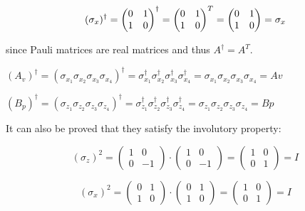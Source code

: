 \documentclass{Configuration_Files/PoliMi3i_thesis}
\begin{document}
\[
\text{$( \sigma_x )^{\dagger}$} = 
\begin{pmatrix}
	0 & 1 \\
	1 & 0
\end{pmatrix} ^\dagger =
\begin{pmatrix}
	0 & 1 \\
	1 & 0
\end{pmatrix}^T =
\begin{pmatrix}
	0 & 1 \\
	1 & 0
\end{pmatrix}
= \text{$ \sigma_x $}
\]\newline

since Pauli matrices are real matrices and thus $A^{\dagger}=A^T$.

\begin{center}
	$(A_v)^{\dagger} = (\sigma_{x_1} \sigma_{x_2} \sigma_{x_3} \sigma_{x_4})^{\dagger} = \sigma_{x_1}^{\dagger} \sigma_{x_2}^{\dagger} \sigma_{x_3}^{\dagger} \sigma_{x_4}^{\dagger} = \sigma_{x_1} \sigma_{x_2} \sigma_{x_3} \sigma_{x_4} = Av$ \newline
	
	$(B_p)^{\dagger} = (\sigma_{z_1} \sigma_{z_2} \sigma_{z_3} \sigma_{z_4})^{\dagger} = \sigma_{z_1}^{\dagger} \sigma_{z_2}^{\dagger} \sigma_{z_3}^{\dagger} \sigma_{z_4}^{\dagger} = \sigma_{z_1} \sigma_{z_2} \sigma_{z_3} \sigma_{z_4} = Bp$ \newline
\end{center}

It can also be proved that they satisfy the involutory property:\newline

\[
\text{$( \sigma_z )^{2}$} = 
\begin{pmatrix}
	1 & 0 \\
	0 & -1
\end{pmatrix} \cdot
\begin{pmatrix}
	1 & 0 \\
	0 & -1
\end{pmatrix} =
\begin{pmatrix}
	1 & 0 \\
	0 & 1
\end{pmatrix}
= \text{$I$}
\]


\[
\text{$( \sigma_x )^{2}$} = 
\begin{pmatrix}
	0 & 1 \\
	1 & 0
\end{pmatrix} \cdot
\begin{pmatrix}
	0 & 1 \\
	1 & 0
\end{pmatrix} =
\begin{pmatrix}
	1 & 0 \\
	0 & 1
\end{pmatrix}
= \text{$I$}
\]\newline
\end{document}
